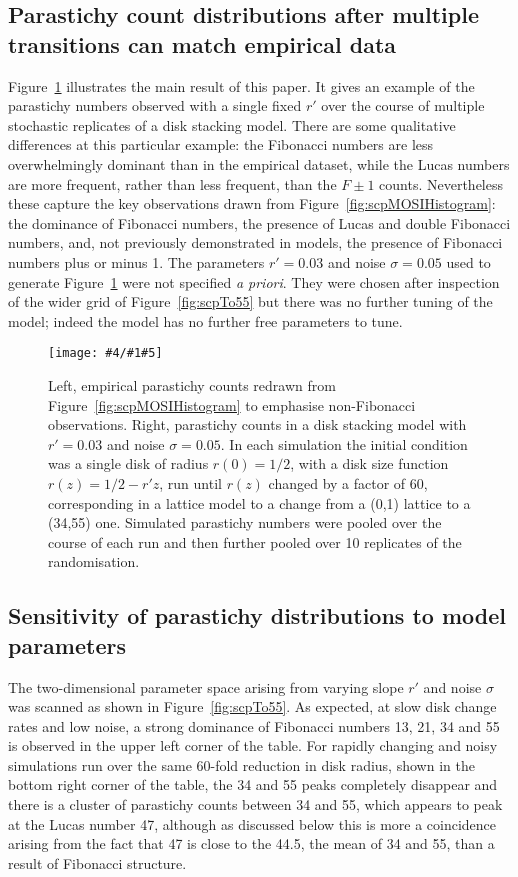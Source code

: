 \documentclass[a4paper,10pt]{amsart}
\newlength{\jfigwidth}
\newcommand{\pdffig}[3]{\jdofig{#1}{#2}{#3}{Figures}{.pdf}}
\newcommand{\jdofig}[5]{
	\begin{figure}\centering\texttt{[image: \#4/\#1\#5]} \caption{#2}\label{fig:#1}\end{figure}
}
\begin{document}
\clearpage

\subsection{Parastichy count distributions after multiple transitions can match empirical data}
Figure~\ref{fig:scpAhaPair} illustrates the main result of this paper. It gives an example of the parastichy numbers observed with a single fixed $r'$ over the course of multiple stochastic replicates of a disk stacking model.    There are some qualitative differences at this particular example: the Fibonacci numbers are less overwhelmingly dominant than in the empirical dataset, while the Lucas numbers are more frequent, rather than less frequent, than the $F\pm1$ counts. Nevertheless these capture the key observations drawn from  Figure~\ref{fig:scpMOSIHistogram}: the dominance of Fibonacci numbers, the  presence of Lucas and double Fibonacci numbers, and,  not previously demonstrated in models, the presence of Fibonacci numbers plus or minus 1. 
The parameters $r'=0.03$ and noise $\sigma=0.05$ used to generate Figure~\ref{fig:scpAhaPair} were not specified \textit{a priori}. They were chosen after inspection of the wider grid of Figure~\ref{fig:scpTo55} but there was no further tuning of the model;  indeed the model has no further free parameters to tune.

\pdffig{scpAhaPair}{Left, empirical parastichy counts redrawn from Figure~\ref{fig:scpMOSIHistogram} to emphasise non-Fibonacci observations. Right,  parastichy counts in a disk stacking model with $r'=0.03$ and noise $\sigma=0.05$. In each simulation the initial condition was a single disk of radius $r(0)=1/2$, with a disk size function $r(z)=1/2- r'z$, run until $r(z)$ changed by a factor of  60, corresponding in a lattice model to a change from a (0,1) lattice to a (34,55) one. 
	Simulated parastichy numbers were pooled over the course of each run and then further pooled over 10 replicates of the randomisation. }{1}

\subsection{Sensitivity of parastichy distributions to model parameters}

The two-dimensional parameter space arising from varying slope $r'$ and noise $\sigma$ was scanned as shown in  Figure~\ref{fig:scpTo55}. As expected, at slow disk change rates and low noise, a strong dominance of Fibonacci numbers 13, 21, 34 and 55 is observed in the upper left corner of the table. For rapidly changing and noisy simulations run over the same 60-fold reduction in disk radius, shown in the bottom right corner of the table, the 34 and 55 peaks completely disappear and there is a cluster of parastichy counts between 34 and 55, which appears to peak at the Lucas number 47, although as discussed below this is more a coincidence arising from the fact that 47 is close to the 44.5, the mean of 34 and 55, than a result of Fibonacci structure. 
\end{document}
